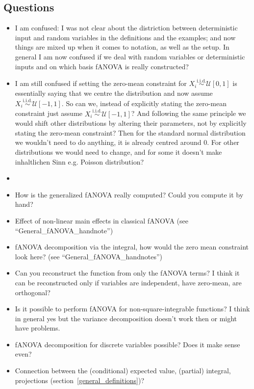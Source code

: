 \subsection*{Questions}
\begin{itemize}
    \item I am confused: I was not clear about the distriction between deterministic input and random variables in the definitions and the examples; and now things are mixed up when it comes to notation, as well as the setup. In general I am now confused if we deal with random variables or deterministic inputs and on which basis fANOVA is really constructed?
    \item I am still confused if setting the zero-mean constraint for $X_i \overset{\text{i.i.d.}}{\sim} \mathcal{U}[0, 1]$ is essentially saying that we centre the distribution and now assume $X_i \overset{\text{i.i.d.}}{\sim} \mathcal{U}[-1, 1]$. So can we, instead of explicitly stating the zero-mean constraint just assume $X_i \overset{\text{i.i.d.}}{\sim} \mathcal{U}[-1, 1]$? And following the same principle we would shift other distributions by altering their parameters, not by explicitly stating the zero-mean constraint? Then for the standard normal distribution we wouldn't need to do anything, it is already centred around 0. For other distributions we would need to change, and for some it doesn't make inhaltlichen Sinn e.g. Poisson distribution?
    \item 
    \item How is the generalized fANOVA really computed? Could you compute it by hand?
    \item Effect of non-linear main effects in classical fANOVA (see ``General\_fANOVA\_handnote'')
    \item fANOVA decomposition via the integral, how would the zero mean constraint look here? (see ``General\_fANOVA\_handnotes'')
    \item Can you reconstruct the function from only the fANOVA terms? I think it can be reconstructed only if variables are independent, have zero-mean, are orthogonal?
    \item Is it possible to perform fANOVA for non-square-integrable functions? I think in general yes but the variance decomposition doesn't work then or might have problems. 
    \item fANOVA decomposition for discrete variables possible? Does it make sense even?
    \item Connection between the (conditional) expected value, (partial) integral, projections (section~\ref{general_definitions})?

\end{itemize}
